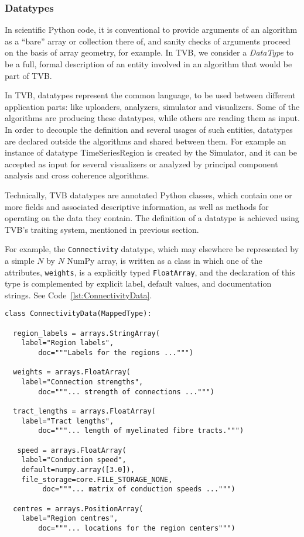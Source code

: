 \subsubsection{Datatypes}

In scientific Python code, it is conventional to provide arguments
of an algorithm as a ``bare'' array or collection there of, and sanity
checks of arguments proceed on the basis of array geometry, for example.
In TVB, we consider a \textit{DataType} to be a full, formal description of 
an entity involved in an algorithm that would be part of TVB. 

In TVB, datatypes represent the common language, to be used between different
application parts: like uploaders, analyzers, simulator and visualizers.
Some of the algorithms are producing these datatypes, while others are reading
them as input.  In order to decouple the definition and several usages of such
entities, datatypes are declared outside the algorithms and shared between them.
For example an instance of datatype TimeSeriesRegion is created by the
Simulator, and it can be accepted as input for several visualizers or analyzed
by principal component analysis and cross coherence algorithms.

Technically, TVB datatypes are annotated Python classes, which
contain one or more fields and associated descriptive information, as
well as methods for operating on the data they contain. The definition of a
datatype is achieved using TVB's traiting system, mentioned in previous section.

For example, the \texttt{Connectivity} datatype, which may elsewhere
be represented by a simple $N$ by $N$ NumPy array, is written as a class
in which one of the attributes, \texttt{weights}, is a explicitly typed 
\texttt{FloatArray}, and the declaration of this type is complemented by
explicit label, default values, and documentation strings. See
Code~\ref{lst:ConnectivityData}.

\begin{lstlisting}[caption={The ConnectivityData listing},
                   label={lst:ConnectivityData}]
class ConnectivityData(MappedType):

  region_labels = arrays.StringArray( 
	label="Region labels", 
        doc="""Labels for the regions ...""")

  weights = arrays.FloatArray( 
	label="Connection strengths",
        doc="""... strength of connections ...""")

  tract_lengths = arrays.FloatArray( 
	label="Tract lengths",
        doc="""... length of myelinated fibre tracts.""")

   speed = arrays.FloatArray( 
	label="Conduction speed", 
	default=numpy.array([3.0]), 
	file_storage=core.FILE_STORAGE_NONE,
         doc="""... matrix of conduction speeds ...""")

  centres = arrays.PositionArray( 
	label="Region centres",
        doc="""... locations for the region centers""")
\end{lstlisting}
	


